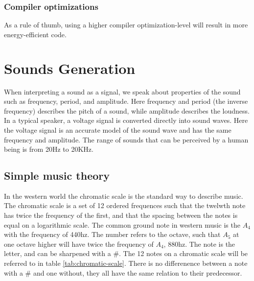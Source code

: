 \subsubsection{Compiler optimizations}
As a rule of thumb, using a higher compiler optimization-level will result in more energy-efficient code.


%


\section{Sounds Generation}\label{sec:sound-generation}
When interpreting a sound as a signal, we speak about properties of the sound such as frequency, period, and amplitude. Here frequency and period (the inverse frequency) describes the pitch of a sound, while amplitude describes the loudness. In a typical speaker, a voltage signal is converted directly into sound waves. Here the voltage signal is an accurate model of the sound wave and has the same frequency and amplitude. The range of sounds that can be perceived by a human being is from 20Hz to 20KHz.\cite{compendium}

\subsection{Simple music theory}
In the western world the chromatic scale is the standard way to describe music. The chromatic scale is a set of 12 ordered frequences such that the twelwth note has twice the frequency of the first, and that the spacing between the notes is equal on a logarithmic scale. The common ground note in western music is the $A_{4}$ with the frequency of 440hz. The number refers to the octave, such that $A_{5}$ at one octave higher will have twice the frequency of $A_{4}$, 880hz. The note is the letter, and can be sharpened with a \#. The 12 notes on a chromatic scale will be referred to in table \ref{tab:chromatic-scale}. There is no differenence between a note with a \# and one without, they all have the same relation to their predecessor.

